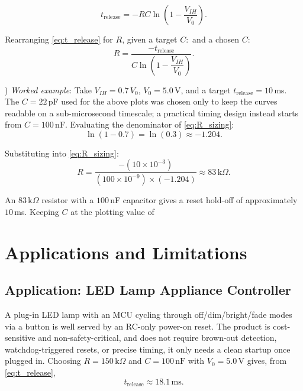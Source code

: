 \documentclass[conference]{IEEEtran}
\begin{document}
\begin{equation}
t_{\text{release}} = -RC\ln\left(1-\frac{V_{IH}}{V_0}\right).
\label{eq:t_release}
\end{equation}

Rearranging \eqref{eq:t_release} for $R$, given a target $C:$
and a chosen $C$:
\begin{equation}
R = \frac{-t_{\text{release}}}{C\ln\left(1-\dfrac{V_{IH}}{V_0}\right)}.
\label{eq:R_sizing}
\end{equation}

) \textit{Worked example}: Take $V_{IH} = 0.7\,V_0$, $V_0 = 5.0\,$V, and
a target $t_{\text{release}} = 10\,$ms. The $C = 22\,$pF used for the above plots
 was chosen only to keep the curves readable on a sub-microsecond
timescale; a practical timing design instead starts from $C = 100\,$nF.
Evaluating the denominator of \eqref{eq:R_sizing}:
\begin{equation}
\ln(1-0.7) = \ln(0.3) \approx -1.204.
\label{eq:denom}
\end{equation}

\noindent Substituting into \eqref{eq:R_sizing}:
\begin{equation}
R = \frac{-(10\times10^{-3})}{(100\times10^{-9})\times(-1.204)}
\approx 83\,\text{k}\Omega.
\label{eq:R_result}
\end{equation}

\noindent An $83\,\text{k}\Omega$ resistor with a $100\,$nF capacitor gives a reset hold-off of approximately $10\,$ms. Keeping $C$ at the plotting value of

\section{Applications and Limitations}

\subsection{Application: LED Lamp Appliance Controller}
A plug-in LED lamp with an MCU cycling through
off/dim/bright/fade modes via a button is well served by an
RC-only power-on reset. The product is cost-sensitive and
non-safety-critical, and does not require brown-out
detection, watchdog-triggered resets, or precise timing,
it only needs a clean startup once plugged in. Choosing
$R = 150\,\text{k}\Omega$ and $C = 100\,\text{nF}$ with
$V_0 = 5.0\,\text{V}$ gives, from \eqref{eq:t_release},
\[
t_\text{release} \approx 18.1\,\text{ms}.
\]
\end{document}
